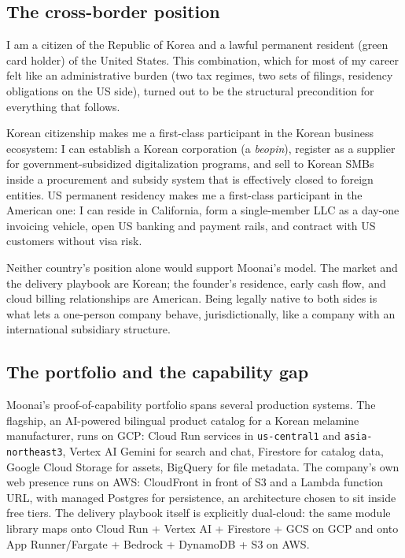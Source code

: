\documentclass{article}
\begin{document}
\subsection{The cross-border position}

I am a citizen of the Republic of Korea and a lawful permanent resident (green card holder) of the United States. This combination, which for most of my career felt like an administrative burden (two tax regimes, two sets of filings, residency obligations on the US side), turned out to be the structural precondition for everything that follows.

Korean citizenship makes me a first-class participant in the Korean business ecosystem: I can establish a Korean corporation (a \emph{beopin}), register as a supplier for government-subsidized digitalization programs, and sell to Korean SMBs inside a procurement and subsidy system that is effectively closed to foreign entities. US permanent residency makes me a first-class participant in the American one: I can reside in California, form a single-member LLC as a day-one invoicing vehicle, open US banking and payment rails, and contract with US customers without visa risk.

Neither country's position alone would support Moonai's model. The market and the delivery playbook are Korean; the founder's residence, early cash flow, and cloud billing relationships are American. Being legally native to both sides is what lets a one-person company behave, jurisdictionally, like a company with an international subsidiary structure.

\subsection{The portfolio and the capability gap}

Moonai's proof-of-capability portfolio spans several production systems. The flagship, an AI-powered bilingual product catalog for a Korean melamine manufacturer, runs on GCP: Cloud Run services in \texttt{us-central1} and \texttt{asia-northeast3}, Vertex AI Gemini for search and chat, Firestore for catalog data, Google Cloud Storage for assets, BigQuery for file metadata. The company's own web presence runs on AWS: CloudFront in front of S3 and a Lambda function URL, with managed Postgres for persistence, an architecture chosen to sit inside free tiers. The delivery playbook itself is explicitly dual-cloud: the same module library maps onto Cloud Run + Vertex AI + Firestore + GCS on GCP and onto App Runner/Fargate + Bedrock + DynamoDB + S3 on AWS.
\end{document}
